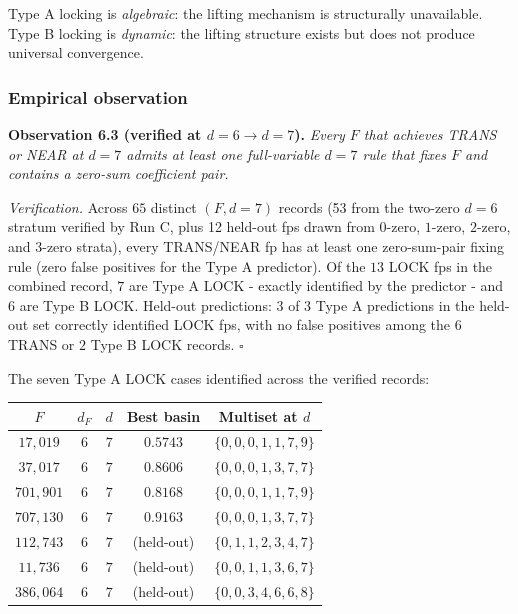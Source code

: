 \documentclass[11pt,letterpaper]{article}
\theoremstyle{paperstyle}
\theoremstyle{paperstyledef}
\theoremstyle{paperstylerem}
\begin{document}
Type A locking is \emph{algebraic}: the lifting mechanism is
structurally unavailable. Type B locking is \emph{dynamic}: the lifting
structure exists but does not produce universal convergence.

\hypertarget{empirical-observation}{%
\subsubsection{Empirical observation}\label{empirical-observation}}

\textbf{Observation 6.3 (verified at \(d = 6 \to d = 7\)).} \emph{Every
\(F\) that achieves TRANS or NEAR at \(d = 7\) admits at least one
full-variable \(d = 7\) rule that fixes \(F\) and contains a zero-sum
coefficient pair.}

\emph{Verification.} Across \(65\) distinct \((F, d = 7)\) records (53
from the two-zero \(d = 6\) stratum verified by Run C, plus 12 held-out
fps drawn from \(0\)-zero, \(1\)-zero, \(2\)-zero, and \(3\)-zero
strata), every TRANS/NEAR fp has at least one zero-sum-pair fixing rule
(zero false positives for the Type A predictor). Of the \(13\) LOCK fps
in the combined record, \(7\) are Type A LOCK - exactly identified by
the predictor - and \(6\) are Type B LOCK. Held-out predictions: \(3\)
of \(3\) Type A predictions in the held-out set correctly identified
LOCK fps, with no false positives among the \(6\) TRANS or \(2\) Type B
LOCK records. \(\square\)

The seven Type A LOCK cases identified across the verified records:

\begin{longtable}[]{@{}ccccc@{}}
\toprule\noalign{}
\(F\) & \(d_F\) & \(d\) & Best basin & Multiset at \(d\) \\
\midrule\noalign{}
\endhead
\bottomrule\noalign{}
\endlastfoot
\(17{,}019\) & \(6\) & \(7\) & \(0.5743\) &
\(\{0, 0, 0, 1, 1, 7, 9\}\) \\
\(37{,}017\) & \(6\) & \(7\) & \(0.8606\) &
\(\{0, 0, 0, 1, 3, 7, 7\}\) \\
\(701{,}901\) & \(6\) & \(7\) & \(0.8168\) &
\(\{0, 0, 0, 1, 1, 7, 9\}\) \\
\(707{,}130\) & \(6\) & \(7\) & \(0.9163\) &
\(\{0, 0, 0, 1, 3, 7, 7\}\) \\
\(112{,}743\) & \(6\) & \(7\) & (held-out) &
\(\{0, 1, 1, 2, 3, 4, 7\}\) \\
\(11{,}736\) & \(6\) & \(7\) & (held-out) &
\(\{0, 0, 1, 1, 3, 6, 7\}\) \\
\(386{,}064\) & \(6\) & \(7\) & (held-out) &
\(\{0, 0, 3, 4, 6, 6, 8\}\) \\
\end{longtable}
\end{document}
